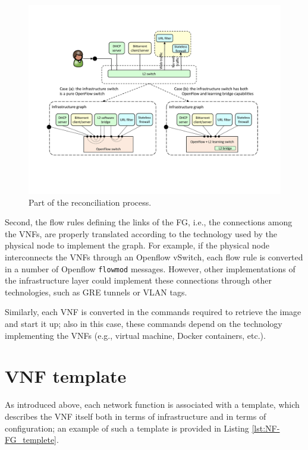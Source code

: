 \begin{figure}%
	\centering
	\includegraphics[clip= true, width= 0.8\columnwidth, trim= 0in 1.5in 0in 0in]{images/NF-FG_reconciliation.pdf}
	\caption{Part of the reconciliation process.}
	\label{fig:infrastructure_graph}
\end{figure}

Second, the flow rules defining the links of the FG, i.e., the connections among the VNFs, are properly translated according to the technology used by the physical node to implement the graph.
For example, if the physical node interconnects the VNFs through an Openflow vSwitch, each flow rule is converted in a number of Openflow \texttt{flowmod} messages.
However, other implementations of the infrastructure layer could implement these connections through other technologies, such as GRE tunnels or VLAN tags.

Similarly, each VNF is converted in the commands required to retrieve the image and start it up; also in this case, these commands depend on the technology implementing the VNFs (e.g., virtual machine, Docker containers, etc.).







\section{VNF template}
\label{chap:VNFdescriptor}
\label{sec:template}
As introduced above, each network function is associated with a template, which describes the VNF itself both in terms of infrastructure and in terms of configuration; an example of such a template is provided in Listing \ref{lst:NF-FG_templete}.

